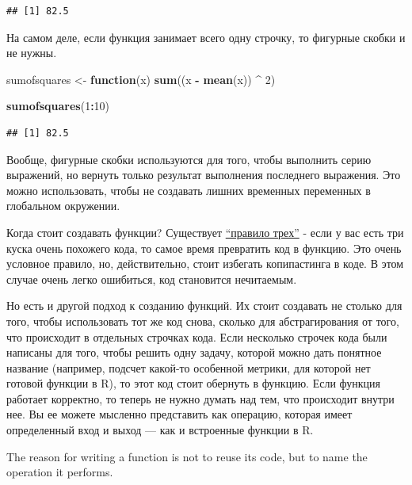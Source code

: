 \documentclass[]{book}
\newenvironment{Shaded}{\begin{snugshade}}{\end{snugshade}}
\newcommand{\KeywordTok}[1]{\textcolor[rgb]{0.13,0.29,0.53}{\textbf{#1}}}
\newcommand{\DecValTok}[1]{\textcolor[rgb]{0.00,0.00,0.81}{#1}}
\newcommand{\StringTok}[1]{\textcolor[rgb]{0.31,0.60,0.02}{#1}}
\newcommand{\ControlFlowTok}[1]{\textcolor[rgb]{0.13,0.29,0.53}{\textbf{#1}}}
\newcommand{\OperatorTok}[1]{\textcolor[rgb]{0.81,0.36,0.00}{\textbf{#1}}}
\newcommand{\NormalTok}[1]{#1}
\begin{document}
\begin{verbatim}
## [1] 82.5
\end{verbatim}

На самом деле, если функция занимает всего одну строчку, то фигурные
скобки и не нужны.

\begin{Shaded}
\begin{Highlighting}[]
\NormalTok{sumofsquares <-}\StringTok{ }\ControlFlowTok{function}\NormalTok{(x) }\KeywordTok{sum}\NormalTok{((x }\OperatorTok{-}\StringTok{ }\KeywordTok{mean}\NormalTok{(x)) }\OperatorTok{^}\StringTok{ }\DecValTok{2}\NormalTok{)}

\KeywordTok{sumofsquares}\NormalTok{(}\DecValTok{1}\OperatorTok{:}\DecValTok{10}\NormalTok{)}
\end{Highlighting}
\end{Shaded}

\begin{verbatim}
## [1] 82.5
\end{verbatim}

Вообще, фигурные скобки используются для того, чтобы выполнить серию
выражений, но вернуть только результат выполнения последнего выражения.
Это можно использовать, чтобы не создавать лишних временных переменных в
глобальном окружении.

Когда стоит создавать функции? Существует
\href{https://en.wikipedia.org/wiki/Rule_of_three_(computer_programming)}{``правило
трех''} - если у вас есть три куска очень похожего кода, то самое время
превратить код в функцию. Это очень условное правило, но, действительно,
стоит избегать копипастинга в коде. В этом случае очень легко ошибиться,
код становится нечитаемым.

Но есть и другой подход к созданию функций. Их стоит создавать не
столько для того, чтобы использовать тот же код снова, сколько для
абстрагирования от того, что происходит в отдельных строчках кода. Если
несколько строчек кода были написаны для того, чтобы решить одну задачу,
которой можно дать понятное название (например, подсчет какой-то
особенной метрики, для которой нет готовой функции в R), то этот код
стоит обернуть в функцию. Если функция работает корректно, то теперь не
нужно думать над тем, что происходит внутри нее. Вы ее можете мысленно
представить как операцию, которая имеет определенный вход и выход ---
как и встроенные функции в R.

The reason for writing a function is not to reuse its code, but to name
the operation it performs.
\end{document}
